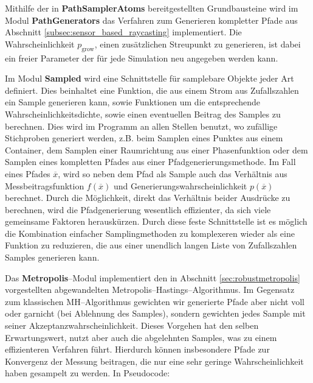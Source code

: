 	Mithilfe der in \textbf{PathSamplerAtoms} bereitgestellten Grundbausteine wird im Modul \textbf{PathGenerators} das Verfahren zum Generieren kompletter Pfade aus Abschnitt \ref{subsec:sensor_based_raycasting} implementiert. Die Wahrscheinlichkeit $p_\text{grow}$, einen zu\-sätz\-lich\-en Streupunkt zu generieren, ist dabei ein freier Parameter der für jede Simulation neu angegeben werden kann.
	
	Im Modul \textbf{Sampled} wird eine Schnittstelle für samplebare Objekte jeder Art definiert. Dies beinhaltet eine Funktion, die aus einem Strom aus Zufallszahlen ein Sample generieren kann, sowie Funktionen um die entsprechende Wahrscheinlichkeitsdichte, sowie einen eventuellen Beitrag des Samples zu berechnen. Dies wird im Programm an allen Stellen benutzt, wo zufällige Stichproben generiert werden, z.B. beim Samplen eines Punktes aus einem Container, dem Samplen einer Raumrichtung aus einer Phasenfunktion oder dem Samplen eines kompletten Pfades aus einer Pfadgenerierungsmethode. Im Fall eines Pfades ${\overline x}$, wird so neben dem Pfad als Sample auch das Verhältnis aus Messbeitragsfunktion $f({\overline x})$ und Generierungswahrscheinlichkeit $p({\overline x})$ berechnet. Durch die Möglichkeit, direkt das Verhältnis beider Ausdrücke zu berechnen, wird die Pfadgenerierung wesentlich effizienter, da sich viele gemeinsame Faktoren herauskürzen. Durch diese feste Schnittstelle ist es möglich die Kombination einfacher Samplingmethoden zu komplexeren wieder als eine Funktion zu reduzieren, die aus einer unendlich langen Liste von Zufallszahlen Samples generieren kann.
	
	Das \textbf{Metropolis}--Modul implementiert den in Abschnitt \ref{sec:robustmetropolis} vorgestellten abgewandelten Metropolis--Hastings--Algorithmus. Im Gegensatz zum klassischen MH--Algorithmus gewichten wir generierte Pfade aber nicht voll oder garnicht (bei Ablehnung des Samples), sondern gewichten jedes Sample mit seiner Akzeptanzwahrscheinlichkeit. Dieses Vorgehen hat den selben Erwartungswert, nutzt aber auch die abgelehnten Samples, was zu einem effizienteren Verfahren führt. Hierdurch können insbesondere Pfade zur Konvergenz der Messung beitragen, die nur eine sehr geringe Wahrscheinlichkeit haben gesampelt zu werden. In Pseudocode:
	
